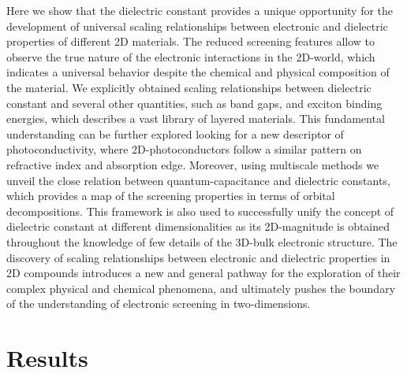 \documentclass[journal=ancac3,manuscript=article,email=true,hyperref=true,keywords=true]{achemso}
\begin{document}
Here we show that the dielectric constant provides a unique opportunity for 
the development of universal scaling relationships between electronic and 
dielectric properties of different 2D materials. The reduced screening features 
allow to observe the true nature of the electronic interactions in 
the 2D-world, which indicates a universal behavior despite the chemical 
and physical composition of the material. 
We explicitly obtained scaling 
relationships between dielectric constant and several 
other quantities, such as band gaps, and exciton binding 
energies, which describes a vast library of layered materials. 
This fundamental understanding can be further explored
looking for a new descriptor of photoconductivity, 
where 2D-photoconductors follow a similar pattern on refractive index 
and absorption edge.    
Moreover, using multiscale methods we unveil the close relation between quantum-capacitance and dielectric 
constants, which provides a map of the screening properties in terms of orbital decompositions.  
This framework is also used to successfully unify the concept of dielectric constant 
at different dimensionalities as its 2D-magnitude is obtained 
throughout the knowledge of few details of the 
3D-bulk electronic structure. The discovery of scaling relationships 
between electronic and dielectric properties in 
2D compounds introduces a new and general pathway for the exploration of their complex 
physical and chemical phenomena, and ultimately pushes the boundary 
of the understanding of electronic screening in two-dimensions. 

\section{Results}
\label{sec:org93965d9}
\end{document}
